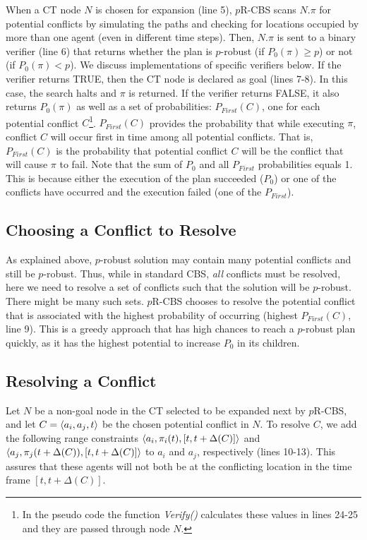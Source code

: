 \documentclass{article}
\newcommand{\prcbs}{$p$R-CBS\xspace}
\begin{document}
When a CT node $N$ is chosen for expansion (line 5), \prcbs{} scans $N.\pi$ for potential conflicts by simulating the paths and checking for locations occupied by more than one agent (even in different time steps). Then, $N.\pi$ is sent to a binary verifier (line 6) that returns whether the plan is $p$-robust (if $P_0(\pi) \geq p$) or not (if $P_0(\pi) < p$). We discuss implementations of specific verifiers below. If the verifier returns TRUE, then the CT node is declared as goal (lines 7-8). In this case, the search halts and $\pi$ is returned. If   the verifier returns FALSE, it also returns $P_0(\pi)$ as well as a set of probabilities: $P_{First}(C)$, one for each potential conflict $C$\footnote{In the pseudo code the function {\em Verify()} calculates these values in lines 24-25 and they are passed through node $N$.}. $P_{First}(C)$ provides the probability that while executing $\pi$, conflict $C$ will occur first in time among all potential conflicts. That is, $P_{First}(C)$ is the probability that potential conflict $C$ will be the conflict that will cause $\pi$ to fail. Note that the sum of $P_0$ and all $P_{First}$ probabilities equals 1. This is because either the execution of the plan succeeded ($P_0$) or one of the conflicts have occurred and the execution failed (one of the $P_{First}$). 


\subsection{Choosing a Conflict to Resolve} 

As explained above, $p$-robust solution may contain many potential conflicts and still be $p$-robust. Thus, while in standard CBS, {\em all} conflicts must be resolved, here we need to resolve a set of conflicts such that the solution will be $p$-robust. There might be many such sets. \prcbs{} chooses to resolve the potential conflict that is associated with the highest probability of occurring (highest $P_{First}(C)$, line 9). This is a greedy approach that has high chances to reach a $p$-robust plan quickly, as it has the highest potential to increase $P_0$ in its children. 


\subsection{Resolving a Conflict} 

Let $N$ be a non-goal node in the CT selected to be expanded next by \prcbs, and let $C=\left \langle a_i,a_j,t \right \rangle $ be the chosen potential conflict in $N$. %
To resolve $C$, we add the following range constraints
$\left \langle a_i, \pi_i(t), [t, t+\Delta(C)] \right \rangle $ 
and $\left \langle a_j, \pi_j(t+\Delta(C)), [t, t+\Delta(C)] \right \rangle $ 
to $a_i$ and $a_j$, respectively (lines 10-13). 
This assures that these agents will not both be at the conflicting location in the time frame $[t,t+\Delta(C)]$. %
\end{document}
